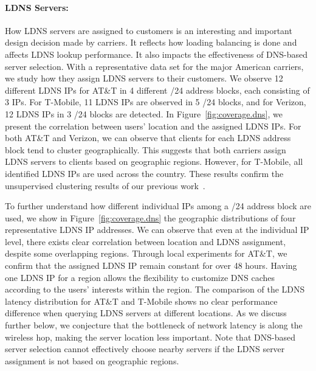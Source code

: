 \paragraph{LDNS Servers:} How LDNS servers are assigned to customers is an interesting and important design decision made by carriers. It reflects how loading balancing is done and affects LDNS lookup performance. It also impacts the effectiveness of DNS-based server selection. With a representative data set for the major American carriers, we study how they assign LDNS servers to their customers. We observe 12 different LDNS IPs for AT\&T in 4 different /24 address blocks, each consisting of 3 IPs. For T-Mobile, 11 LDNS IPs are observed in 5 /24 blocks, and for Verizon, 12 LDNS IPs in 3 /24 blocks are detected. In Figure~\ref{fig:coverage.dns}, we present the correlation between users' location and the assigned LDNS IPs. For both AT\&T and Verizon, we can observe that clients for each LDNS address block tend to cluster geographically. This suggests that both carriers assign LDNS servers to clients based on geographic regions. However, for T-Mobile, all identified LDNS IPs are used across the country. These results confirm the unsupervised clustering results of our previous work~\cite{sigmetrics.cluster}. 

To further understand how different individual IPs among a /24 address
block are used, we show in Figure~\ref{fig:coverage.dns} the geographic distributions of four representative LDNS IP addresses.
We can observe that even at the individual IP level, there exists clear correlation between location and LDNS
assignment, despite some overlapping regions. Through local
experiments for AT\&T, we confirm that the assigned LDNS IP remain
constant for over 48 hours. Having one LDNS IP for a region allows
the flexibility to customize DNS caches according to the users' interests
within the region. The comparison of the LDNS latency distribution for
AT\&T and T-Mobile shows no clear performance difference when querying LDNS servers at different locations.
As we discuss further below, we conjecture that the
bottleneck of network latency is along the wireless hop, making the
server location less important. Note that DNS-based server selection
cannot effectively choose nearby servers if the LDNS server assignment
is not based on geographic regions.

